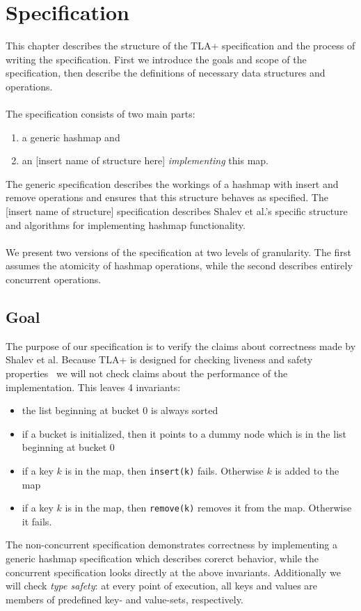 \documentclass{uit-thesis}
\begin{document}
\chapter{Specification}\label{ch:specification}
This chapter describes the structure of the TLA+ specification and the process of writing the specification. First we introduce the goals and scope of the specification, then describe the definitions of necessary data structures and operations.
\\\\
The specification consists of two main parts:
\begin{enumerate}
    \item a generic hashmap and
    \item an [insert name of structure here] \textit{implementing} this map.
\end{enumerate}
The generic specification describes the workings of a hashmap with insert and remove operations and ensures that this structure behaves as specified. The [insert name of structure] specification describes Shalev et al.'s specific structure and algorithms for implementing hashmap functionality.
\\\\
We present two versions of the specification at two levels of granularity. The first assumes the atomicity of hashmap operations, while the second describes entirely concurrent operations.

\section{Goal}\label{sec:spec-goals}
The purpose of our specification is to verify the claims about correctness made by Shalev et al. Because TLA+ is designed for checking liveness and safety properties~\cite{Lund2019} we will not check claims about the performance of the implementation. This leaves 4 invariants:
\begin{itemize}
    \item the list beginning at bucket 0 is always sorted
    \item if a bucket is initialized, then it points to a dummy node which is in the list beginning at bucket 0
    \item if a key $k$ is in the map, then \texttt{insert(k)} fails. Otherwise $k$ is added to the map
    \item if a key $k$ is in the map, then \texttt{remove(k)} removes it from the map. Otherwise it fails.
\end{itemize}
The non-concurrent specification demonstrates correctness by implementing a generic hashmap specification which describes corerct behavior, while the concurrent specification looks directly at the above invariants.
Additionally we will check \textit{type safety}: at every point of execution, all keys and values are members of predefined key- and value-sets, respectively.
\end{document}
